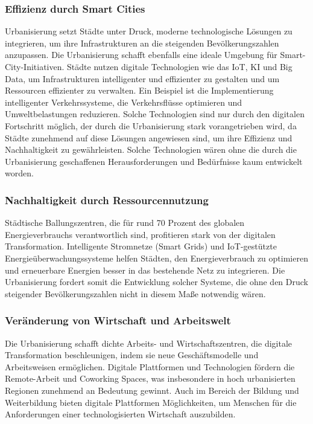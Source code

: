 \documentclass[conference,compsoc,final,a4paper, onecolumn, 11pt]{IEEEtran}
\begin{document}
\subsubsection{Effizienz durch Smart Cities}
Urbanisierung setzt Städte unter Druck, moderne technologische Lösungen zu integrieren, um ihre Infrastrukturen an die steigenden Bevölkerungszahlen anzupassen.
Die Urbanisierung schafft ebenfalls eine ideale Umgebung für Smart-City-Initiativen. 
Städte nutzen digitale Technologien wie das \ac{IoT}, \ac{KI} und Big Data, um Infrastrukturen intelligenter und effizienter zu gestalten und um Ressourcen effizienter zu verwalten.
Ein Beispiel ist die Implementierung intelligenter Verkehrssysteme, die Verkehrsflüsse optimieren und Umweltbelastungen reduzieren. 
Solche Technologien sind nur durch den digitalen Fortschritt möglich, der durch die Urbanisierung stark vorangetrieben wird, da Städte zunehmend auf diese Lösungen angewiesen sind, um ihre Effizienz und Nachhaltigkeit zu gewährleisten.
Solche Technologien wären ohne die durch die Urbanisierung geschaffenen Herausforderungen und Bedürfnisse kaum entwickelt worden. \autocite{mckinsey_smart_cities}


\subsubsection{ Nachhaltigkeit durch Ressourcennutzung}
Städtische Ballungszentren, die für rund 70 Prozent des globalen Energieverbrauchs verantwortlich sind, profitieren stark von der digitalen Transformation. 
Intelligente Stromnetze (Smart Grids) und \ac{IoT}-gestützte Energieüberwachungssysteme helfen Städten, den Energieverbrauch zu optimieren und erneuerbare Energien besser in das bestehende Netz zu integrieren.
Die Urbanisierung fordert somit die Entwicklung solcher Systeme, die ohne den Druck steigender Bevölkerungszahlen nicht in diesem Maße notwendig wären.\autocite{mdpi_smart_cities_iot}
 

\subsubsection{	Veränderung von Wirtschaft und Arbeitswelt}
Die Urbanisierung schafft dichte Arbeits- und Wirtschaftszentren, die digitale Transformation beschleunigen, indem sie neue Geschäftsmodelle und Arbeitsweisen ermöglichen.
Digitale Plattformen und Technologien fördern die Remote-Arbeit und Coworking Spaces, was insbesondere in hoch urbanisierten Regionen zunehmend an Bedeutung gewinnt.
Auch im Bereich der Bildung und Weiterbildung bieten digitale Plattformen Möglichkeiten, um Menschen für die Anforderungen einer technologisierten Wirtschaft auszubilden. \autocite{xpert_digital_urbanization}
\end{document}
